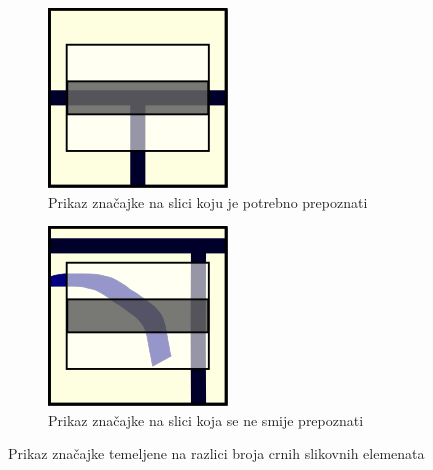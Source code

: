 \documentclass[times, utf8, zavrsni, numeric]{fer}
\begin{document}
\begin{figure}[th!]
    \centering
    \begin{subfigure}{.5\textwidth}
        \centering
        \includegraphics[width=.45\linewidth]{Images/Feature_true_4.png}
        \captionsetup{justification=centering}
        \caption{Prikaz značajke na slici koju je potrebno prepoznati}
        \label{fig:featureDemo4a}
    \end{subfigure}%
    \begin{subfigure}{.5\textwidth}
        \centering
        \includegraphics[width=.45\linewidth]{Images/Feature_false_4.png}
        \captionsetup{justification=centering}
        \caption{Prikaz značajke na slici koja se ne smije prepoznati}
        \label{fig:featureDemo4b}
    \end{subfigure}
    \caption{Prikaz značajke temeljene na razlici broja crnih slikovnih elemenata}
    \label{fig:featureDemo4}
\end{figure}
\end{document}
